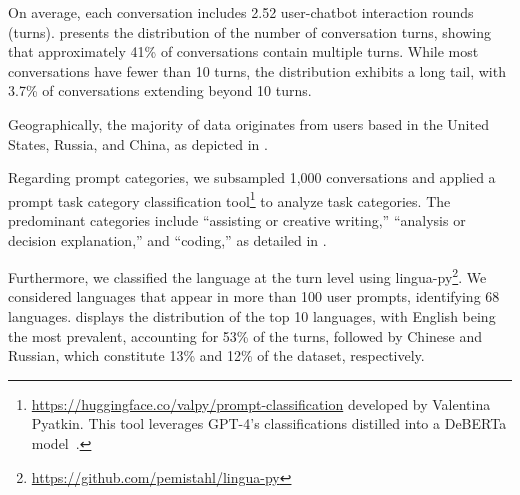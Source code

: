 \documentclass{article} %
\begin{document}
On average, each conversation includes 2.52 user-chatbot interaction rounds (turns).  presents the distribution of the number of conversation turns, showing that approximately 41\% of conversations contain multiple turns. While most conversations have fewer than 10 turns, the distribution exhibits a long tail, with 3.7\% of conversations extending beyond 10 turns.


Geographically, the majority of data originates from users based in the United States, Russia, and China, as depicted in .

Regarding prompt categories, we subsampled 1,000 conversations and applied a prompt task category classification tool\footnote{\url{https://huggingface.co/valpy/prompt-classification} developed by Valentina Pyatkin. This tool leverages GPT-4's classifications distilled into a DeBERTa model~\citep{he2021deberta}.} to analyze task categories. The predominant categories include ``assisting or creative writing,'' ``analysis or decision explanation,'' and ``coding,'' as detailed in .

Furthermore, we classified the language at the turn level using lingua-py\footnote{\url{https://github.com/pemistahl/lingua-py}}. We considered languages that appear in more than 100 user prompts, identifying 68 languages.  displays the distribution of the top 10 languages, with English being the most prevalent, accounting for 53\% of the turns, followed by Chinese and Russian, which constitute 13\% and 12\% of the dataset, respectively.

\end{document}

